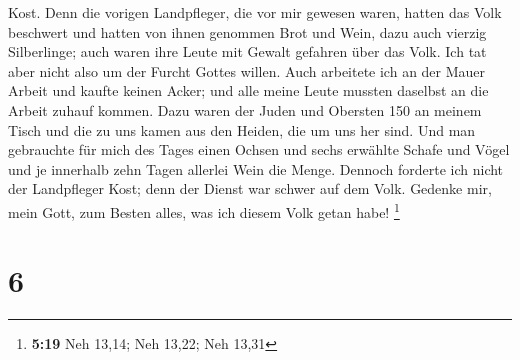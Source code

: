 Kost.  Denn die vorigen Landpfleger, die vor mir gewesen
waren, hatten das Volk beschwert und hatten von ihnen genommen Brot und
Wein, dazu auch vierzig Silberlinge; auch waren ihre Leute mit Gewalt
gefahren über das Volk. Ich tat aber nicht also um der Furcht Gottes
willen.  Auch arbeitete ich an der Mauer Arbeit und
kaufte keinen Acker; und alle meine Leute mussten daselbst an die Arbeit
zuhauf kommen.  Dazu waren der Juden und Obersten 150 an
meinem Tisch und die zu uns kamen aus den Heiden, die um uns her sind.
 Und man gebrauchte für mich des Tages einen Ochsen und
sechs erwählte Schafe und Vögel und je innerhalb zehn Tagen allerlei
Wein die Menge. Dennoch forderte ich nicht der Landpfleger Kost; denn
der Dienst war schwer auf dem Volk.  Gedenke mir, mein
Gott, zum Besten alles, was ich diesem Volk getan habe! \footnote{\textbf{5:19}
  Neh 13,14; Neh 13,22; Neh 13,31}

\hypertarget{section-5}{%
\section{6}\label{section-5}}

